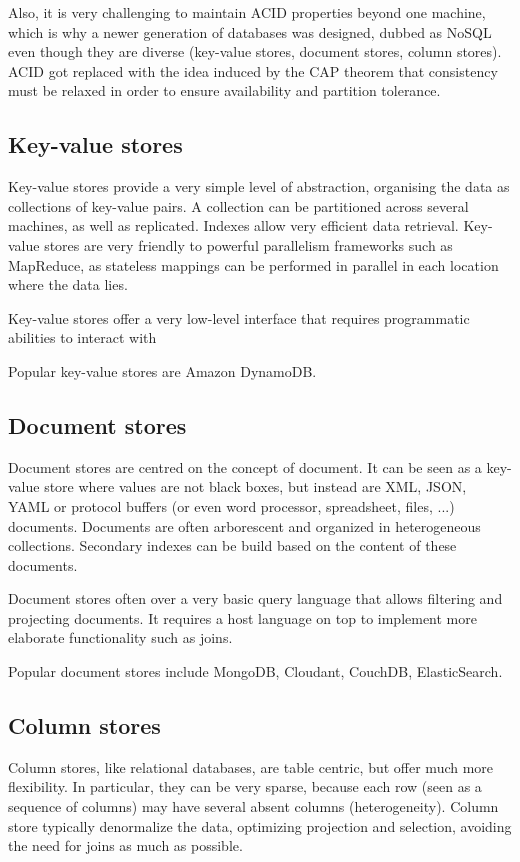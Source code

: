 \documentclass{vldb}
\begin{document}
Also, it is very challenging to maintain ACID properties beyond one machine, which is why a newer generation of databases was designed, dubbed as NoSQL even though they are diverse (key-value stores, document stores, column stores). ACID got replaced with the idea induced by the CAP theorem that consistency must be relaxed in order to ensure availability and partition tolerance.

\subsection{Key-value stores}

Key-value stores provide a very simple level of abstraction, organising the data as collections of key-value pairs. A collection can be partitioned across several machines, as well as replicated. Indexes allow very efficient data retrieval. Key-value stores are very friendly to powerful parallelism frameworks such as MapReduce, as stateless mappings can be performed in parallel in each location where the data lies.

Key-value stores offer a very low-level interface that requires programmatic abilities to interact with

Popular key-value stores are Amazon DynamoDB.

\subsection{Document stores}

Document stores are centred on the concept of document. It can be seen as a key-value store where values are not black boxes, but instead are XML, JSON, YAML or protocol buffers (or even word processor, spreadsheet, files, ...) documents. Documents are often arborescent and organized in heterogeneous collections. Secondary indexes can be build based on the content of these documents.

Document stores often over a very basic query language that allows filtering and projecting documents. It requires a host language on top to implement more elaborate functionality such as joins. 

Popular document stores include MongoDB, Cloudant, CouchDB, ElasticSearch.

\subsection{Column stores}

Column stores, like relational databases, are table centric, but offer much more flexibility. In particular, they can be very sparse, because each row (seen as a sequence of columns) may have several absent columns (heterogeneity). Column store typically denormalize the data, optimizing projection and selection, avoiding the need for joins as much as possible.
\end{document}

